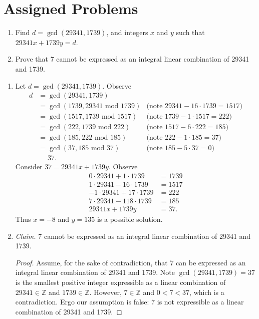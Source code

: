 \documentclass{article}
\newcommand{\Z}{\mathbb{Z}}
\newcommand{\modulo}{\text{ mod }}
\theoremstyle{definition}
\begin{document}
\section*{Assigned Problems}
\begin{question}
    \begin{enumerate}
        \item Find $d = \gcd(29341,1739)$, and integers $x$ and $y$ such that $29341x + 1739y = d$.
        \item Prove that 7 cannot be expressed as an integral linear combination of 29341 and 1739.
    \end{enumerate}
\end{question}
\begin{solution}
\begin{enumerate}
\item Let $d=\gcd(29341,1739)$. Observe
\begin{align*}
d
&=\gcd(29341,1739)\\
&=\gcd(1739,29341 \modulo 1739)&\text{(note }29341-16\cdot 1739=1517\text{)}\\
&=\gcd(1517,1739 \modulo 1517)&\text{(note }1739-1\cdot 1517=222\text{)}\\
&=\gcd(222,1739 \modulo 222)&\text{(note }1517-6\cdot 222=185\text{)}\\
&=\gcd(185,222 \modulo 185)&\text{(note }222-1\cdot 185=37\text{)}\\
&=\gcd(37,185 \modulo 37)&\text{(note }185-5\cdot 37=0\text{)}\\
&=37.
\end{align*}
Consider $37=29341x+1739y$. Observe
\begin{align*}
0\cdot 29341+1\cdot 1739&=1739\\
1\cdot 29341-16\cdot 1739&=1517\\
-1\cdot 29341+17\cdot 1739&=222\\
7\cdot 29341-118\cdot 1739&=185\\
29341x+1739y&=37.
\end{align*}
Thus $x=-8$ and $y=135$ is a possible solution.
\item\textit{Claim. } 7 cannot be expressed as an integral linear combination of 29341 and 1739.
\begin{proof}
Assume, for the sake of contradiction, that 7 can be expressed as an integral linear combination of 29341 and 1739. Note $\gcd(29341,1739)=37$ is the smallest positive integer expressible as a linear combination of $29341\in\Z$ and $1739\in\Z$. However, $7\in\Z$ and $0<7<37$, which is a contradiction. Ergo our assumption is false: 7 is not expressible as a linear combination of 29341 and 1739. 
\end{proof}
\end{enumerate}
\end{solution}
\end{document}
